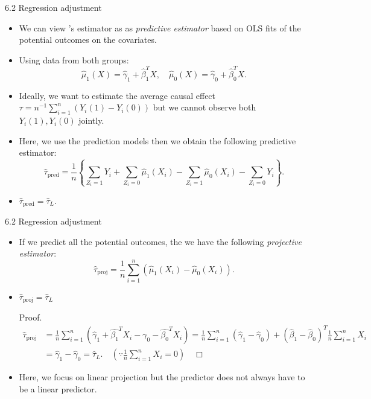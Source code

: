 \documentclass[aspectratio=169, 12pt]{beamer}
\begin{document}
\begin{frame}{6.2 Regression adjustment}
  \begin{itemize}
    \item We can view \citet{lin2013agnostic}'s estimator as as \textit{predictive estimator} based on OLS fits of the potential outcomes on the covariates.
    \item Using data from both groups:
    \[
    \widehat{\mu}_1(X)=\widehat{\gamma}_1+\widehat{\beta}_1^TX,\quad 
    \widehat{\mu}_0(X)=\widehat{\gamma}_0+\widehat{\beta}_0^TX.
    \]
    \item Ideally, we want to estimate the average causal effect $\tau=n^{-1}\sum_{i=1}^{n}(Y_i(1)-Y_i(0))$ but we cannot observe both $Y_i(1),Y_i(0)$ jointly. 
    \item Here, we use the prediction models then we obtain the following predictive estimator:
    \[
    \widehat{\tau}_{\text{pred}}=\frac{1}{n}\left\{
      \sum_{Z_i=1}^{}Y_i+\sum_{Z_i=0}^{}\widehat{\mu}_1(X_i)-\sum_{Z_i=1}^{}\widehat{\mu}_0(X_i)-\sum_{Z_i=0}^{}Y_i
    \right\}.
    \]
    \item $\widehat{\tau}_{\text{pred}}=\widehat{\tau}_L$.
  \end{itemize}
\end{frame}

\begin{frame}{6.2 Regression adjustment}
  \begin{itemize}
    \item If we predict all the potential outcomes, the we have the following \textit{projective estimator}:
    \[
    \widehat{\tau}_{\text{proj}}=\frac{1}{n}\sum_{i=1}^{n}(\widehat{\mu}_1(X_i)-\widehat{\mu}_0(X_i)).
    \]
    \item $\widehat{\tau}_{\text{proj}}=\widehat{\tau}_L$

    {
      \small
      Proof.
      \begin{align*}
        \widehat{\tau}_{\text{proj}}
        &=\frac{1}{n}\sum_{i=1}^{n}(\widehat{\gamma}_1+\widehat{\beta_1}^TX_i-\gamma_0-\widehat{\beta_0}^TX_i)
        =\frac{1}{n}\sum_{i=1}^{n}(\widehat{\gamma}_1-\widehat{\gamma}_0)+(\widehat{\beta}_1-\widehat{\beta}_0)^T\frac{1}{n}\sum_{i=1}^{n}X_i\\
        &=\widehat{\gamma}_1-\widehat{\gamma}_0
        =\widehat{\tau}_L.\quad (\because \frac{1}{n}\sum_{i=1}^{n}X_i=0)\quad\Box
      \end{align*}
    }
    \item Here, we focus on linear projection but the predictor does not always have to be a linear predictor.
  \end{itemize}
\end{frame}
\end{document}
